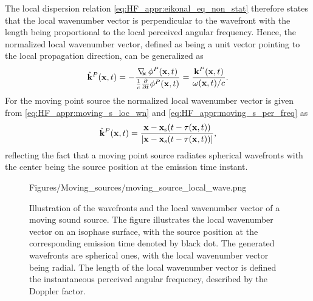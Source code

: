 The local dispersion relation \eqref{eq:HF_appr:eikonal_eq_non_stat} therefore states that the local wavenumber vector is perpendicular to the wavefront with the length being proportional to the local perceived angular frequency.
Hence, the normalized local wavenumber vector, defined as being a unit vector pointing to the local propagation direction, can be generalized as
\begin{equation}
\label{eq:Moving_source:local_wn_general}
\hat{\mathbf{k}}^P(\mathbf{x},t) = -\frac{\nabla_{\!\!\mathbf{x}}\, \phi^P(\mathbf{x},t)}{\frac{1}{c}\frac{\partial}{\partial t} \phi^P(\mathbf{x},t)}  = \frac{\mathbf{k}^P(\mathbf{x},t)}{ \omega(\mathbf{x},t)/c }.
\end{equation}
For the moving point source the normalized local wavenumber vector is given from \eqref{eq:HF_appr:moving_s_loc_wn} and \eqref{eq:HF_appr:moving_s_per_freq} as
\begin{equation}
\label{eq:Moving_source:norm_local_wn_moving_source}
\hat{\mathbf{k}}^P(\mathbf{x},t) = \frac{\mathbf{x} -\mathbf{x}_{\mathrm{s}}(t-\tau(\mathbf{x},t))}{|\mathbf{x}-\mathbf{x}_{\mathrm{s}}(t-\tau(\mathbf{x},t))|},
\end{equation}
reflecting the fact that a moving point source radiates spherical wavefronts with the center being the source position at the emission time instant.
\begin{figure} 
	\small
    \begin{minipage}[c]{0.6\textwidth}
    \hspace{0cm}
	\begin{overpic}[width = 1.0\columnwidth ]{Figures/Moving_sources/moving_source_local_wave.png}
	\small
	\end{overpic} 
	\end{minipage}
	\hspace{10mm}
	\begin{minipage}[c]{0.35\textwidth}
    \caption{
	Illustration of the wavefronts and the local wavenumber vector of a moving sound source.
	The figure illustrates the local wavenumber vector on an isophase surface, with the source position at the corresponding emission time denoted by black dot.
	The generated wavefronts are spherical ones, with the local wavenumber vector being radial.
	The length of the local wavenumber vector is defined the instantaneous perceived angular frequency, described by the Doppler factor.}
	\label{Fig:Moving_source:moving_source_local_wn}
	\end{minipage}
\end{figure}  

